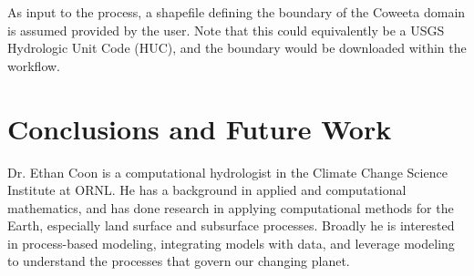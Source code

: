 \documentclass[a4paper,fleqn]{cas-dc}
\begin{document}
As input to the process, a shapefile defining the boundary of the Coweeta domain is assumed provided by the user.
Note that this could equivalently be a USGS Hydrologic Unit Code (HUC), and the boundary would be downloaded within the workflow.

\section{Conclusions and Future Work}\label{sec:conclusions}

\printcredits






Dr. Ethan Coon is a computational hydrologist in the Climate Change Science Institute at ORNL.
He has a background in applied and computational mathematics, and has done research in applying computational methods for the Earth, especially land surface and subsurface processes.
Broadly he is interested in process-based modeling, integrating models with data, and leverage modeling to understand the processes that govern our changing planet.
\endbio
\end{document}
